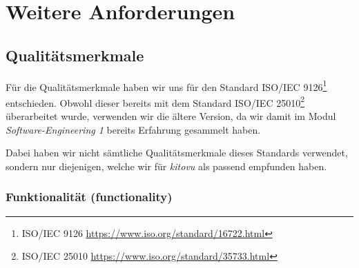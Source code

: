 \documentclass[a4paper]{article}
\let\oldsection\section
\renewcommand\section{\clearpage\oldsection}
\begin{document}
\section{Weitere Anforderungen}

\subsection{Qualitätsmerkmale}

\newcommand{\isourl}[2]{ISO/IEC #1\footnote{ISO/IEC #1 \url{https://www.iso.org/standard/#2.html}}}

Für die Qualitätsmerkmale haben wir uns für den Standard \isourl{9126}{16722} entschieden. Obwohl dieser bereits mit dem Standard \isourl{25010}{35733} überarbeitet wurde, verwenden wir die ältere Version, da wir damit im Modul \emph{Software-Engineering 1} bereits Erfahrung gesammelt haben.

Dabei haben wir nicht sämtliche Qualitätsmerkmale dieses Standards verwendet, sondern nur diejenigen, welche wir für \emph{kitovu} als passend empfunden haben.

\newcommand{\metricheader}[2]{\textbf{#1} & \textbf{#2}}

\subsubsection{Funktionalität (functionality)}
\end{document}
